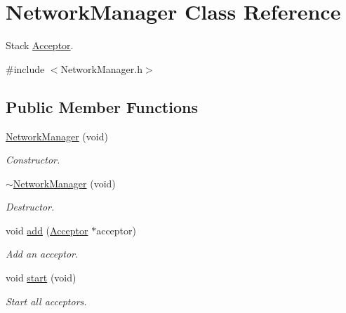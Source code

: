 \hypertarget{class_network_manager}{\section{Network\-Manager Class Reference}
\label{class_network_manager}
}


Stack \hyperlink{class_acceptor}{Acceptor}.  




{\ttfamily \#include $<$Network\-Manager.\-h$>$}

\subsection*{Public Member Functions}
\begin{DoxyCompactItemize}
\item 
\hypertarget{class_network_manager_accb59ac87ad70fcaef8a530d618e3f5e}{\hyperlink{class_network_manager_accb59ac87ad70fcaef8a530d618e3f5e}{Network\-Manager} (void)}\label{class_network_manager_accb59ac87ad70fcaef8a530d618e3f5e}

\begin{DoxyCompactList}\small\item\em Constructor. \end{DoxyCompactList}\item 
\hypertarget{class_network_manager_adf95b75d453e5d742fabd008c28f8479}{\hyperlink{class_network_manager_adf95b75d453e5d742fabd008c28f8479}{$\sim$\-Network\-Manager} (void)}\label{class_network_manager_adf95b75d453e5d742fabd008c28f8479}

\begin{DoxyCompactList}\small\item\em Destructor. \end{DoxyCompactList}\item 
void \hyperlink{class_network_manager_a82e2d4292e78d3119368622f0c99ab51}{add} (\hyperlink{class_acceptor}{Acceptor} $\ast$acceptor)
\begin{DoxyCompactList}\small\item\em Add an acceptor. \end{DoxyCompactList}\item 
\hypertarget{class_network_manager_a876f84dfd977153148e7fc45eb1ed1d9}{void \hyperlink{class_network_manager_a876f84dfd977153148e7fc45eb1ed1d9}{start} (void)}\label{class_network_manager_a876f84dfd977153148e7fc45eb1ed1d9}

\begin{DoxyCompactList}\small\item\em Start all acceptors. \end{DoxyCompactList}\end{DoxyCompactItemize}


